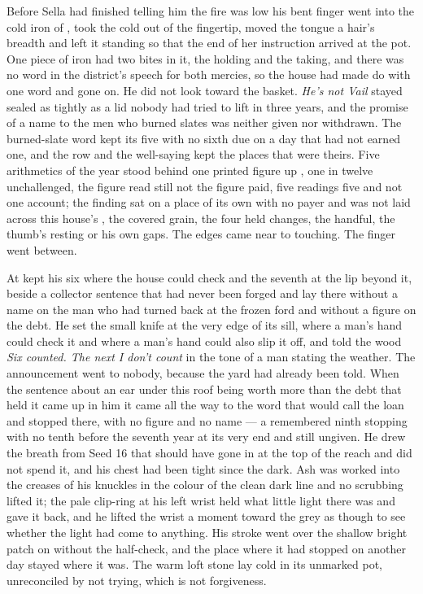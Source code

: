 Before Sella had finished telling him the fire was low his bent finger went into the cold iron of , took the cold out of the fingertip, moved the tongue a hair's breadth and left it standing so that the end of her instruction arrived at the pot. One piece of iron had two bites in it, the holding and the taking, and there was no word in the district's speech for both mercies, so the house had made do with one word and gone on. He did not look toward the basket. \emph{He's not Vail} stayed sealed as tightly as a lid nobody had tried to lift in three years, and the promise of a name to the men who burned slates was neither given nor withdrawn. The burned-slate word kept its five with no sixth due on a day that had not earned one, and the row and the well-saying kept the places that were theirs. Five arithmetics of the year stood behind one printed figure up , one in twelve unchallenged, the figure read still not the figure paid, five readings five and not one account; the finding sat on a place of its own with no payer and was not laid across this house's , the covered grain, the four held changes, the handful, the thumb's resting or his own gaps. The edges came near to touching. The finger went between.

At   kept his six where the house could check and the seventh at the lip beyond it, beside a collector sentence that had never been forged and lay there without a name on the man who had turned back at the frozen ford and without a figure on the debt. He set the small knife at the very edge of its sill, where a man's hand could check it and where a man's hand could also slip it off, and told the wood \emph{Six counted. The next I don't count} in the tone of a man stating the weather. The announcement went to nobody, because the yard had already been told. When the sentence about an ear under this roof being worth more than the debt that held it came up in him it came all the way to the word that would call the loan and stopped there, with no figure and no name --- a remembered ninth stopping with no tenth before the seventh year at its very end and still ungiven. He drew the breath from Seed 16 that should have gone in at the top of the reach and did not spend it, and his chest had been tight since the dark. Ash was worked into the creases of his knuckles in the colour of the clean dark line and no scrubbing lifted it; the pale clip-ring at his left wrist held what little light there was and gave it back, and he lifted the wrist a moment toward the grey as though to see whether the light had come to anything. His stroke went over the shallow bright patch on  without the half-check, and the place where it had stopped on another day stayed where it was. The warm loft stone lay cold in its unmarked pot, unreconciled by not trying, which is not forgiveness.

